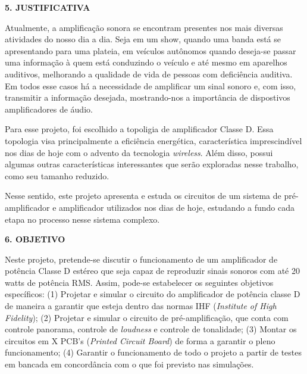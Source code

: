 \documentclass{article}
\begin{document}
\vspace{0.4cm}

\textbf{5. JUSTIFICATIVA}

Atualmente, a amplificação sonora se encontram presentes nos mais diversas atividades do nosso dia a dia. Seja em um
show, quando uma banda está se apresentando para uma plateia, em veículos autônomos quando deseja-se passar uma informação à quem está
conduzindo o veículo e até mesmo em aparelhos auditivos, melhorando a qualidade de vida de pessoas com deficiência auditiva.
Em todos esse casos há a necessidade de amplificar um sinal sonoro e, com isso, transmitir a informação desejada, mostrando-nos a importância
de dispostivos amplificadores de áudio.


Para esse projeto, foi escolhido a topoligia de amplificador Classe D. Essa topologia visa principalmente a eficiência energética, característica imprescindível
nos dias de hoje com o advento da tecnologia \textit{wireless}. Além disso, possui algumas outras características interessantes que serão exploradas nesse trabalho,
como seu tamanho reduzido.


Nesse sentido, este projeto apresenta e estuda os circuitos de um sistema de pré-amplificador e amplificador utilizados nos dias de hoje,
estudando a fundo cada etapa no processo nesse sistema complexo.


\vspace{0.4cm}

\textbf{6. OBJETIVO}

Neste projeto, pretende-se discutir o funcionamento de um amplificador de potência Classe D estéreo que seja capaz de reproduzir sinais sonoros com até 20 watts de 
potência RMS. Assim, pode-se estabelecer os seguintes objetivos específicos: (1) Projetar e simular o circuito do amplificador de potência classe D de maneira a garantir
que esteja dentro das normas IHF (\textit{Institute of High Fidelity}); (2) Projetar e simular o circuito de pré-amplificação, que conta com controle panorama, controle
de \textit{loudness} e controle de tonalidade; (3) Montar os circuitos em X PCB's (\textit{Printed Circuit Board}) de forma a garantir o pleno funcionamento; (4) Garantir
o funcionamento de todo o projeto a partir de testes em bancada em concordância com o que foi previsto nas simulações.
\end{document}
